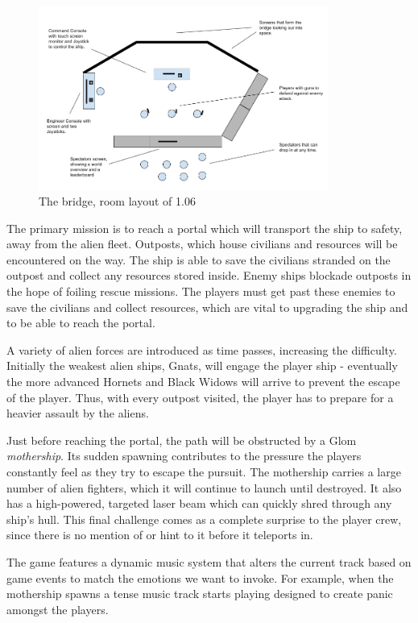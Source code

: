 \documentclass[a4paper,11pt]{article}
\begin{document}
\begin{figure}[h!]
	\centering
    \includegraphics[width=0.85\textwidth]{images/Room}
    \caption{The bridge, room layout of 1.06}
    \label{fig:room_layout}
\end{figure}

The primary mission is to reach a portal which will transport the ship to safety, away from the alien fleet. Outposts, which house civilians and resources will be encountered on the way. The ship is able to save the civilians stranded on the outpost and collect any resources stored inside. Enemy ships blockade outposts in the hope of foiling rescue missions. The players must get past these enemies to save the civilians and collect resources, which are vital to upgrading the ship and to be able to reach the portal.

A variety of alien forces are introduced as time passes, increasing the difficulty. Initially the weakest alien ships, Gnats, will engage the player ship - eventually the more advanced Hornets and Black Widows will arrive to prevent the escape of the player. Thus, with every outpost visited, the player has to prepare for a heavier assault by the aliens.

Just before reaching the portal, the path will be obstructed by a Glom \emph{mothership}. Its sudden spawning contributes to the pressure the players constantly feel as they try to escape the pursuit. The mothership carries a large number of alien fighters, which it will continue to launch until destroyed. It also has a high-powered, targeted laser beam which can quickly shred through any ship's hull. This final challenge comes as a complete surprise to the player crew, since there is no mention of or hint to it before it teleports in.

The game features a dynamic music system that alters the current track based on game events to match the emotions we want to invoke. For example, when the mothership spawns a tense music track starts playing designed to create panic amongst the players.
\end{document}
